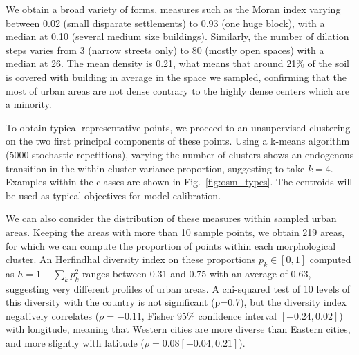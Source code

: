 \documentclass[letterpaper]{article}
\begin{document}
We obtain a broad variety of forms, measures such as the Moran index varying between 0.02 (small disparate settlements) to 0.93 (one huge block), with a median at 0.10 (several medium size buildings). Similarly, the number of dilation steps varies from 3 (narrow streets only) to 80 (mostly open spaces) with a median at 26. The mean density is 0.21, what means that around 21\% of the soil is covered with building in average in the space we sampled, confirming that the most of urban areas are not dense contrary to the highly dense centers which are a minority.


To obtain typical representative points, we proceed to an unsupervised clustering on the two first principal components of these points. Using a k-means algorithm (5000 stochastic repetitions), varying the number of clusters shows an endogenous transition in the within-cluster variance proportion, suggesting to take $k=4$.
Examples within the classes are shown in Fig.~\ref{fig:osm_types}. %
The centroids will be used as typical objectives for model calibration.


We can also consider the distribution of these measures within sampled urban areas. Keeping the areas with more than 10 sample points, we obtain 219 areas, for which we can compute the proportion of points within each morphological cluster. An Herfindhal diversity index on these proportions $p_k \in \left[0,1\right]$ computed as $h = 1 - \sum_k p_k^2$ ranges between 0.31 and 0.75 with an average of 0.63, suggesting very different profiles of urban areas. A chi-squared test of 10 levels of this diversity with the country is not significant (p=0.7), but the diversity index negatively correlates ($\rho = -0.11$, Fisher 95\% confidence interval $\left[-0.24,0.02\right]$) with longitude, meaning that Western cities are more diverse than Eastern cities, and more slightly with latitude ($\rho = 0.08 \left[-0.04,0.21\right]$).
\end{document}
